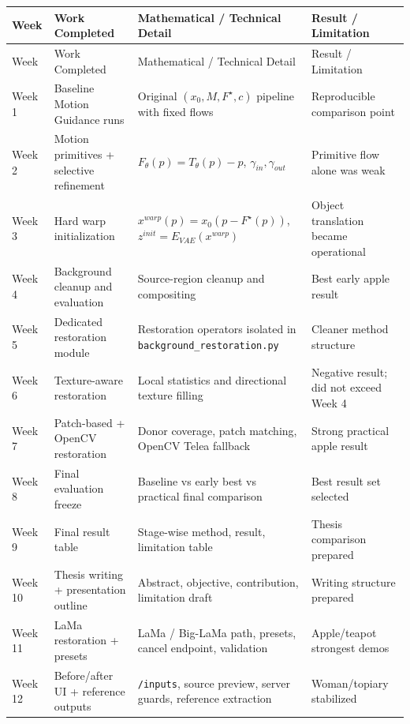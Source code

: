 \documentclass[11pt,a4paper]{article}
\begin{document}
\small
\begin{longtable}{@{}p{}p{}p{}p{}@{}}
\toprule
Week & Work Completed & Mathematical / Technical Detail & Result / Limitation \\
\midrule
\endfirsthead
\toprule
Week & Work Completed & Mathematical / Technical Detail & Result / Limitation \\
\midrule
\endhead
Week 1 & Baseline Motion Guidance runs & Original \((x_0,M,F^\star,c)\) pipeline with fixed flows & Reproducible comparison point \\
Week 2 & Motion primitives + selective refinement & \(F_\theta(p)=T_\theta(p)-p\), \(\gamma_{in},\gamma_{out}\) & Primitive flow alone was weak \\
Week 3 & Hard warp initialization & \(x^{warp}(p)=x_0(p-F^\star(p))\), \(z^{init}=E_{VAE}(x^{warp})\) & Object translation became operational \\
Week 4 & Background cleanup and evaluation & Source-region cleanup and compositing & Best early apple result \\
Week 5 & Dedicated restoration module & Restoration operators isolated in \texttt{background\_restoration.py} & Cleaner method structure \\
Week 6 & Texture-aware restoration & Local statistics and directional texture filling & Negative result; did not exceed Week 4 \\
Week 7 & Patch-based + OpenCV restoration & Donor coverage, patch matching, OpenCV Telea fallback & Strong practical apple result \\
Week 8 & Final evaluation freeze & Baseline vs early best vs practical final comparison & Best result set selected \\
Week 9 & Final result table & Stage-wise method, result, limitation table & Thesis comparison prepared \\
Week 10 & Thesis writing + presentation outline & Abstract, objective, contribution, limitation draft & Writing structure prepared \\
Week 11 & LaMa restoration + presets & LaMa / Big-LaMa path, presets, cancel endpoint, validation & Apple/teapot strongest demos \\
Week 12 & Before/after UI + reference outputs & \texttt{/inputs}, source preview, server guards, reference extraction & Woman/topiary stabilized \\
\bottomrule
\end{longtable}
\normalsize
\end{document}
